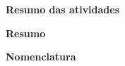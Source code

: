 {\Large\textbf{Resumo das atividades}}
\par
{\Large\textbf{Resumo}}


\newpage
\listoffigures                  %
\newpage                        
\listoftables                   %
\newpage

{\large\textbf{Nomenclatura}}

\newpage


